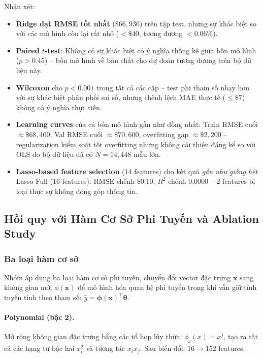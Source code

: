 \documentclass[12pt, a4paper]{article}
\begin{document}
Nhận xét:
\begin{itemize}
  \item \textbf{Ridge đạt RMSE tốt nhất} ($\$66{,}936$) trên tập test,
        nhưng sự khác biệt so với các mô hình còn lại rất nhỏ
        ($< \$40$, tương đương $< 0.06\%$).
  \item \textbf{Paired $t$-test}: Không có sự khác biệt có ý nghĩa
        thống kê giữa bốn mô hình ($p > 0.45$) -- bốn mô hình về bản
        chất cho dự đoán tương đương trên bộ dữ liệu này.
  \item \textbf{Wilcoxon} cho $p < 0.001$ trong tất cả các cặp -- test
        phi tham số nhạy hơn với sự khác biệt phân phối sai số, nhưng
        chênh lệch MAE thực tế ($\leq \$7$) không có ý nghĩa thực tiễn.
  \item \textbf{Learning curves} của cả bốn mô hình gần như đồng nhất:
        Train RMSE cuối $\approx \$68{,}400$, Val RMSE cuối
        $\approx \$70{,}600$, overfitting gap $\approx \$2{,}200$ --
        regularization kiểm soát tốt overfitting nhưng không cải thiện
        đáng kể so với OLS do bộ dữ liệu đã có $N = 14{,}448$ mẫu lớn.
  \item \textbf{Lasso-based feature selection} (14 features) cho kết
        quả \emph{gần như giống hệt} Lasso Full (16 features):
        RMSE chênh $\$0.10$, $R^2$ chênh $0.0000$ -- 2 features bị
        loại thực sự không đóng góp thông tin.
\end{itemize}

\subsection{Hồi quy với Hàm Cơ Sở Phi Tuyến và Ablation Study}
\label{ssec:nonlinear}

\subsubsection{Ba loại hàm cơ sở}

Nhóm áp dụng ba loại hàm cơ sở phi tuyến, chuyển đổi vector đặc trưng
$\mathbf{x}$ sang không gian mới $\phi(\mathbf{x})$ để mô hình hóa quan
hệ phi tuyến trong khi vẫn giữ tính tuyến tính theo tham số:
$\hat{y} = \boldsymbol{\phi}(\mathbf{x})^\top \boldsymbol{\theta}$.

\paragraph{Polynomial (bậc 2).}
Mở rộng không gian đặc trưng bằng các tổ hợp lũy thừa:
$\phi_j(x) = x^j$, tạo ra tất cả các hạng tử bậc hai $x_i^2$ và tương
tác $x_ix_j$. Sau biến đổi: $16 \to 152$ features.
\end{document}
